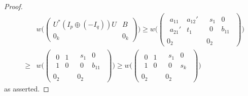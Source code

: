 \documentclass[11pt]{article}
\numberwithin{equation}{section}
\begin{document}
\begin{proof}
\begin{eqnarray*}
&& w\Big(\begin{pmatrix} U^*(I_p\oplus(-I_q))U & B\\ 0_k & 0_k\end{pmatrix}\Big)
 \ge    w\Big(\left(\begin{array}{c|c}\begin{array}{cc} a_{11} & a_{12}'  \\ a_{21}' & t_1 \end{array} & \begin{array}{cc} s_1 & 0 \\ 0 & b_{11} \end{array} \\ \hline 0_2 & 0_2\end{array}\right)\Big) \\
&\ge& w\Big(\left(\begin{array}{c|c}\begin{array}{cc} 0 & 1\\ 1 & 0\end{array} & \begin{array}{cc} s_1 & 0\\ 0 & b_{11}\end{array}
\\ \hline 0_2 & 0_2\end{array}\right)\Big)
 \ge  w\Big(\left(\begin{array}{c|c}\begin{array}{cc} 0 & 1\\ 1 & 0\end{array} & \begin{array}{cc} s_1 & 0\\ 0 & s_k\end{array}
\\ \hline 0_2 & 0_2\end{array}\right)\Big)
\end{eqnarray*}
as asserted.


\end{proof}
\end{document}
